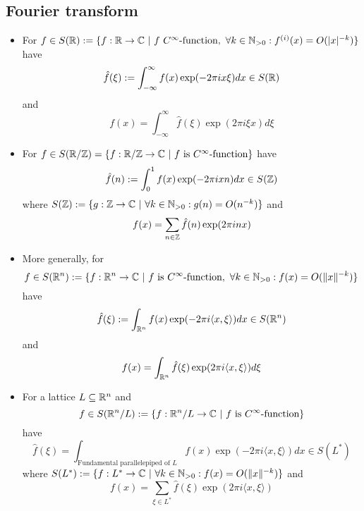 \subsection{Fourier transform}
\begin{itemize}
    \item For $f \in S(\mathbb{R}) := \{ f: \mathbb{R} \to \mathbb{C} \ | \ f \ \text{$C^\infty$-function}, \ \forall k \in \mathbb{N}_{> 0}: f^{(i)}(x) = O(|x|^{-k}) \}$ have
    \begin{equation*}
        \hat{f}(\xi) := \int_{-\infty}^{\infty} f(x) \exp(-2\pi i x \xi) dx \in S(\mathbb{R})
    \end{equation*}
    and
    \begin{equation*}
        f(x) = \int_{-\infty}^{\infty} \hat{f}(\xi) \exp(2\pi i \xi x) d\xi
    \end{equation*}
    \item For $f \in S(\mathbb{R}/\mathbb{Z}) = \{ f: \mathbb{R} / \mathbb{Z} \to \mathbb{C} \ | \ \text{$f$ is $C^\infty$-function}\}$ have
    \begin{equation*}
        \hat{f}(n) := \int_0^1 f(x) \exp(-2\pi i x n) dx \in S(\mathbb{Z})
    \end{equation*}
    where $S(\mathbb{Z}) := \{ g: \mathbb{Z} \to \mathbb{C} \ | \ \forall k \in \mathbb{N}_{> 0}: g(n) = O(n^{-k})\}$ and
    \begin{equation*}
        f(x) = \sum_{n \in \mathbb{Z}} \hat{f}(n) \exp(2\pi i n x)
    \end{equation*}
    \item More generally, for
    \begin{equation*}
        f \in S(\mathbb{R}^n) := \{ f: \mathbb{R}^n \to \mathbb{C} \ | \ \text{$f$ is $C^\infty$-function}, \ \forall k \in \mathbb{N}_{> 0}: f(x) = O(\|x\|^{-k})\}
    \end{equation*}
    have
    \begin{equation*}
        \hat{f}(\xi) := \int_{\mathbb{R}^n} f(x) \exp(-2\pi i \langle x, \xi \rangle) dx \in S(\mathbb{R}^n)
    \end{equation*}
    and
    \begin{equation*}
        f(x) = \int_{\mathbb{R}^n} \hat{f}(\xi) \exp(2\pi i \langle x, \xi \rangle) d\xi
    \end{equation*}
    \item For a lattice $L \subseteq \mathbb{R}^n$ and
    \begin{equation*}
        f \in S(\mathbb{R}^n / L) := \{ f: \mathbb{R}^n / L \to \mathbb{C} \ | \ \text{$f$ is $C^\infty$-function} \}
    \end{equation*}
    have
    \begin{equation*}
        \hat{f}(\xi) = \int_{\text{Fundamental parallelepiped of $L$}} f(x) \exp(-2\pi i \langle x, \xi \rangle) dx \in S(L^*)
    \end{equation*}
    where $S(L^*) := \{ f: L^* \to \C \ | \ \forall k \in \N_{> 0}: f(x) = O(\|x\|^{-k}) \}$ and
    \begin{equation*}
        f(x) = \sum_{\xi \in L^*} \hat{f}(\xi) \exp(2\pi i \langle x, \xi \rangle)
    \end{equation*}
\end{itemize}

